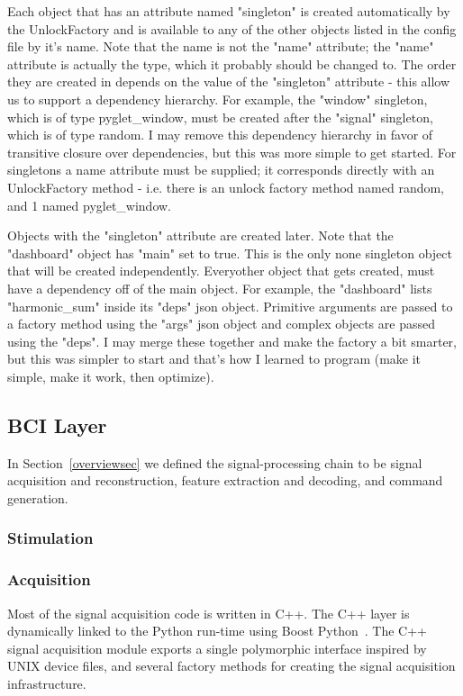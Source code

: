 \documentclass[11pt]{article}
\begin{document}
Each object that has an attribute named "singleton" is created automatically by the UnlockFactory and is available to any of the other objects listed in the config file by it's name.  Note that the name is not the "name" attribute; the "name" attribute is actually the type, which it probably should be changed to.  The order they are created in depends on the value of the "singleton" attribute - this allow us to support a dependency hierarchy.  For example, the "window" singleton, which is of type pyglet\_window, must be created after the "signal" singleton, which is of type random.  I may remove this dependency hierarchy in favor of transitive closure over dependencies, but this was more simple to get started.  For singletons a name attribute must be supplied; it corresponds directly with an UnlockFactory method - i.e. there is an unlock factory method named random, and 1 named pyglet\_window.

Objects with the "singleton" attribute are created later.   Note that the "dashboard" object has "main" set to true.  This is the only none singleton object that will be created independently.  Everyother object that gets created, must have a dependency off of the main object.  For example, the "dashboard" lists "harmonic\_sum" inside its "deps" json object.  Primitive arguments are passed to a factory method using the "args" json object and complex objects are passed using the "deps".  I may merge these together and make the factory a bit smarter, but this was simpler to start and that's how I learned to program (make it simple, make it work, then optimize).

\subsection{BCI Layer}\label{bcisec}

In Section~\ref{overviewsec} we defined the signal-processing chain to be signal acquisition and reconstruction, feature extraction and decoding, and command generation.

\subsubsection{Stimulation}

\subsubsection{Acquisition}\label{acquisitionsec}

Most of the signal acquisition code is written in C++.  The C++ layer is dynamically linked to the Python run-time using Boost Python~\cite{boostpython}.  The C++ signal acquisition module exports a single polymorphic interface inspired by UNIX device files, and several factory methods for creating the signal acquisition infrastructure.
\end{document}
